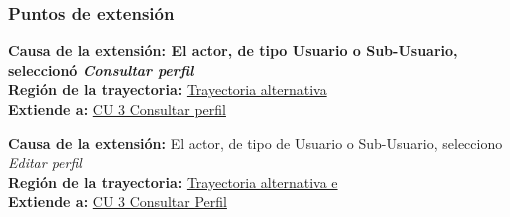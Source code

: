 \subsubsection{Puntos de extensión}
\noindent \textbf{Causa de la extensión: El actor, de tipo Usuario o Sub-Usuario, seleccionó \textit{Consultar perfil}} \\
\textbf{Región de la trayectoria:} \hyperref[cu3_3_ta_]{Trayectoria alternativa } \\
\textbf{Extiende a:} \hyperref[cu3]{CU 3 Consultar perfil}

\noindent \textbf{Causa de la extensión:} El actor, de tipo de Usuario o Sub-Usuario, selecciono \textit{Editar perfil} \\
\textbf{Región de la trayectoria:} \hyperref[cu3_3_ta_e]{Trayectoria alternativa e} \\
\textbf{Extiende a:} \hyperref[cu3]{CU 3 Consultar Perfil}
